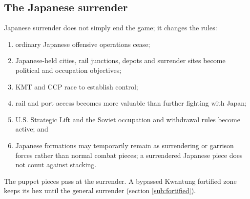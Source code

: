 \documentclass[11pt]{article}
\begin{document}
\subsection{The Japanese surrender}\label{sub:surrender}
Japanese surrender does not simply end the game; it changes the rules:
\begin{enumerate}
\item ordinary Japanese offensive operations cease;
\item Japanese-held cities, rail junctions, depots and surrender sites become political and occupation objectives;
\item KMT and CCP race to establish control;
\item rail and port access becomes more valuable than further fighting with Japan;
\item U.S. Strategic Lift and the Soviet occupation and withdrawal rules become active; and
\item Japanese formations may temporarily remain as surrendering or garrison forces rather than normal combat pieces; a surrendered Japanese piece does not count against stacking.
\end{enumerate}
The puppet pieces pass at the surrender. A bypassed Kwantung fortified zone keeps its hex until the general surrender (section \ref{sub:fortified}).
\end{document}

